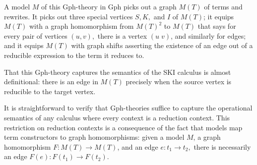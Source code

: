 \documentclass{llncs}
\newcommand{\maps}{\colon}
\begin{document}
A model $M$ of this Gph-theory in Gph picks out a graph $M(T)$ of terms and rewrites.  It picks out three special vertices $S,K,$ and $I$ of $M(T)$; it equips $M(T)$ with a graph homomorphism from $M(T)^2$ to $M(T)$ that says for every pair of vertices $(u,v),$ there is a vertex $(u\;v)$, and similarly for edges; and it equips $M(T)$ with graph shifts asserting the existence of an edge out of a reducible expression to the term it reduces to.

That this Gph-theory captures the semantics of the SKI calculus is almost definitional: there is an edge in $M(T)$ precisely when the source vertex is reducible to the target vertex.  

It is straightforward to verify that Gph-theories suffice to capture the operational semantics of any calculus where every context is a reduction context.  This restriction on reduction contexts is a consequence of the fact that models map term constructors to graph homomorphisms: given a model $M$, a graph homomorphism $F\maps M(T) \to M(T)$, and an edge $e\maps t_1 \to t_2,$ there is necessarily an edge $F(e)\maps F(t_1) \to F(t_2).$
\end{document}
